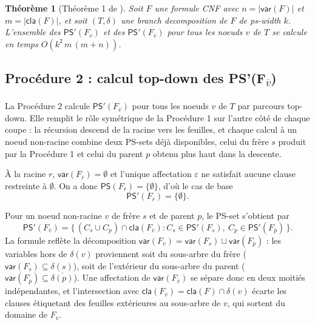 \documentclass[11pt,a4paper]{report}
\theoremstyle{plain}
\newtheorem{theorem}{Théorème}[chapter]
\theoremstyle{definition}
\begin{document}
\begin{theorem}[Théorème 1 de \cite{saether2015}]
\label{thm:proc1-complexity}
Soit $F$ une formule CNF avec $n = |\mathsf{var}(F)|$ et
$m = |\mathsf{cla}(F)|$, et soit $(T, \delta)$ une branch decomposition
de $F$ de ps-width $k$. L'ensemble des $\mathsf{PS}'(F_v)$ et des
$\mathsf{PS}'(F_{\overline{v}})$ pour tous les noeuds $v$ de $T$ se calcule
en temps $O(k^2\, m\, (m + n))$.
\end{theorem}

\subsection{Procédure 2 : calcul top-down des PS'(F\textsubscript{$\overline{v}$})}
\label{ssec:theo-proc2}

La Procédure 2 calcule $\mathsf{PS}'(F_{\overline{v}})$ pour tous les
noeuds $v$ de $T$ par parcours top-down. Elle remplit le rôle symétrique
de la Procédure 1 sur l'autre côté de chaque coupe : la récursion
descend de la racine vers les feuilles, et chaque calcul à un noeud
non-racine combine deux PS-sets déjà disponibles, celui du frère $s$
produit par la Procédure 1 et celui du parent $p$ obtenu plus haut dans
la descente.

À la racine $r$, $\mathsf{var}(F_{\overline{r}}) = \emptyset$ et l'unique
affectation $\varepsilon$ ne satisfait aucune clause restreinte à
$\emptyset$. On a donc $\mathsf{PS}(F_{\overline{r}}) = \{\emptyset\}$,
d'où le cas de base
\[
  \mathsf{PS}'(F_{\overline{r}}) = \{\emptyset\}.
\]

Pour un noeud non-racine $v$ de frère $s$ et de parent $p$, le PS-set
s'obtient par
\[
  \mathsf{PS}'(F_{\overline{v}}) = \bigl\{\,(C_s \cup C_p) \cap \mathsf{cla}(F_{\overline{v}}) :
  C_s \in \mathsf{PS}'(F_s),\ C_p \in \mathsf{PS}'(F_{\overline{p}})\,\bigr\}.
\]
La formule reflète la décomposition $\mathsf{var}(F_{\overline{v}}) =
\mathsf{var}(F_s) \sqcup \mathsf{var}(F_{\overline{p}})$ : les variables
hors de $\delta(v)$ proviennent soit du sous-arbre du frère
($\mathsf{var}(F_s) \subseteq \delta(s)$), soit de l'extérieur du
sous-arbre du parent ($\mathsf{var}(F_{\overline{p}}) \subseteq
\overline{\delta(p)}$). Une affectation de $\mathsf{var}(F_{\overline{v}})$
se sépare donc en deux moitiés indépendantes, et l'intersection avec
$\mathsf{cla}(F_{\overline{v}}) = \mathsf{cla}(F) \cap \delta(v)$ écarte
les clauses étiquetant des feuilles extérieures au sous-arbre de $v$,
qui sortent du domaine de $F_{\overline{v}}$.
\end{document}
